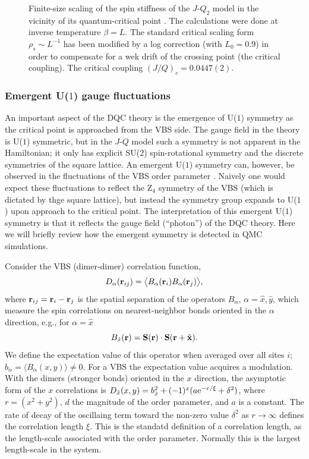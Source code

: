 \documentclass[range]{ar2e}
\begin{document}
\begin{figure}
\centerline{}
\caption{Finite-size scaling of the spin stiffness of the $J$-$Q_2$ model in the vicinity of its quantum-critical point \cite{Sandvik10c}. The 
calculations were done at inverse temperature $\beta=L$. The standard critical scaling form $\rho_s \sim L^{-1}$ has been modified by a log correction 
(with $L_0=0.9$) in order to compensate for a wek drift of the crossing point (the critical coupling). The critical coupling $(J/Q)_c = 0.0447(2)$.}
\label{jqrhos}
\end{figure}

\subsubsection{Emergent U($1$) gauge fluctuations}

An important aspect of the DQC theory is the emergence of U($1$) symmetry as the critical point is approached from the VBS side. 
The gauge field in the theory is U($1$) symmetric, but in the $J$-$Q$ model such a symmetry is not apparent in the Hamiltonian; it
only has explicit SU($2$) spin-rotational symmetry and the discrete symmetries of the square lattice. An emergent U($1$) symmetry 
can, however, be observed in the fluctuations of the VBS order parameter \cite{Sandvik07}. Naively one would expect these fluctuations 
to reflect the Z$_4$ symmetry of the VBS (which is dictated by thge square lattice), but instead the symmetry group expands to U($1$) 
upon approach to the critical point. The interpretation of this emergent U($1$) symmetry is that it reflects the gauge field (``photon'') 
of the DQC theory. Here we will briefly review how the emergent symmetry is detected in QMC simulations.

Consider the VBS (dimer-dimer) correlation function,
\begin{equation}
D_{\alpha} ({\bf r}_{ij}) = \bigl \langle B_\alpha({\bf r}_i)B_\alpha({\bf r}_j) \bigr \rangle, 
\label{cddef}
\end{equation}
where ${\bf r}_{ij}={\bf r}_{i}-{\bf r}_{j}$ is the spatial separation of the operators $B_\alpha$, $\alpha=\hat x,\hat y$,
which measure the spin correlations on nearest-neighbor bonds oriented in the $\alpha$ direction, e.g., for $\alpha=\hat x$
\begin{equation}
B_{\hat x}({\bf r})={\bf S}({\bf r}) \cdot {\bf S}({\bf r}+\hat {\bf x}).
\label{bxdef}
\end{equation}
We define the expectation value of this operator when averaged over all sites $i$; $b_\alpha=\langle B_{\alpha}(x,y)\rangle \not = 0$. For a VBS the expectation 
value acquires a modulation. With the dimers (stronger bonds) oriented in the $x$ direction, the asymptotic form of the $x$ correlations is 
$D_{\hat x}(x,y) = b_{\hat x}^2+(-1)^{x}(a{\rm e}^{-r/\xi}+\delta^2)$, where $r=(x^2+y^2)$, $d$ the magnitude of the order parameter, and $a$ is a constant. The 
rate of decay of the oscillaing term toward the non-zero value $\delta^2$ as $r\to \infty$ defines the correlation length $\xi$. This is the standatd 
definition of a correlation length, as the length-scale associated with the order parameter. Normally this is the largest length-scale in the system. 
\end{document}
